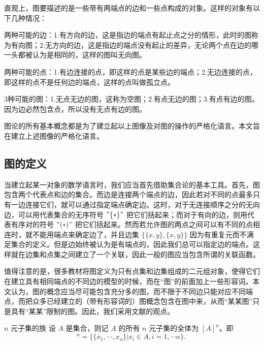 


\cite{graph1}\cite{graph2}直观上，图要描述的是一些带有两端点的边和一些点构成的对象。这样的对象有以下几种情况：

两种可能的边：1.有方向的边，这是指边的端点有起止点之分的情形，此时的图称为有向图；2.无方向的边，这是指边的端点没有起止的差异，无论两个点在边的哪一头都被认为是相同的，这样的图叫无向图。

两种可能的点：1.有边连接的点，即这样的点是某些边的端点；2.无边连接的点，即这样的点不是任何边的端点，这样的点叫做孤立点。

3种可能的图：1.无点无边的图，这称为空图；2.有点无边的图；3.有点有边的图。因为边必然包含点，所以没有无点有边的图。

图论的所有基本概念都是为了建立起以上图像及对图的操作的严格化语言。本文旨在建立上述图像的严格化语言。


\subsection{图的定义}

当建立起某一对象的数学语言时，我们应当首先借助集合论的基本工具。首先，图包含两个代表点和边的集合。而边是连接两个端点的边，因此若对不同的点最多只有一边连接它们，就可以通过指定端点确定边。这时，对于无连接顺序之分的无向边，可以用代表集合的无序符号 $"\{*\}"$ 把它们括起来；而对于有向的边，则用代表有序对的符号 $"(*)"$ 把它们括起来。然而若允许图的两点之间可以有不同的点相连时，就不能用端点来确定边了，并且边集 $\{\{x,y\},\{x,y\}\}$ 因为有重复元而不满足集合的定义。但是边始终被认为是有端点的，因此我们总可以指定边的端点。这样就在边集和点集之间建立了一个关联，因此一般的图应当包含所谓的关联函数。

值得注意的是，很多教材将图定义为只有点集和边集组成的二元组对象，使得它们在建立具有相同端点的不同边的模型的时候，而在“图”的前面加上一些形容词。本文认为，图的概念应当尽可能包含充分多的图，而不限于不同边只能对应不同端点，而把众多已经建立的（带有形容词的）图概念包含在图中来，从而“某某图”只是具有“某某”限制的图。因此，我们采用文献\cite{graph2}的观点。

\begin{definition}{$n$ 元子集的族}
设 $A$ 是集合，则记 $A$ 的所有 $n$ 元子集的全体为 $[A]^n$。即
\begin{equation}
[A]^n=\{\{x_1,\cdots,x_n\}|x_i\in A,i=1,\cdots n\}.~
\end{equation}
\end{definition}

